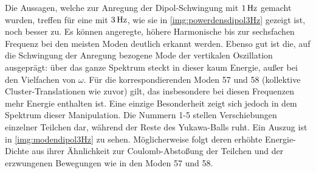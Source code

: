 \documentclass[numbers=noenddot,a4paper,notitlepage,twoside,BCOR15mm]{scrbook}
\begin{document}
						Die Aussagen, welche zur Anregung der Dipol-Schwingung mit $\unit[1]{Hz}$ gemacht wurden, treffen für eine mit $\unit[3]{Hz}$, wie sie in \ref{img:powerdensdipol3Hz} gezeigt ist, noch besser zu. Es können angeregte, höhere Harmonische bis zur sechsfachen Frequenz bei den meisten Moden deutlich erkannt werden. Ebenso gut ist die, auf die Schwingung der Anregung bezogene Mode der vertikalen Oszillation ausgeprägt: über das ganze Spektrum steckt in dieser kaum Energie, außer bei den Vielfachen von $\omega$. Für die korrespondierenden Moden 57 und 58 (kollektive Cluster-Translationen wie zuvor) gilt, das insbesondere bei diesen Frequenzen mehr Energie enthalten ist. Eine einzige Besonderheit zeigt sich jedoch in dem Spektrum dieser Manipulation. Die Nummern 1-5 stellen Verschiebungen einzelner Teilchen dar, während der Reste des Yukawa-Balls ruht. Ein Auszug ist in \ref{img:modendipol3Hz} zu sehen. Möglicherweise folgt deren erhöhte Energie-Dichte aus ihrer Ähnlichkeit zur Coulomb-Abstoßung der Teilchen und der erzwungenen Bewegungen wie in den Moden 57 und 58.

	\newpage
\end{document}

